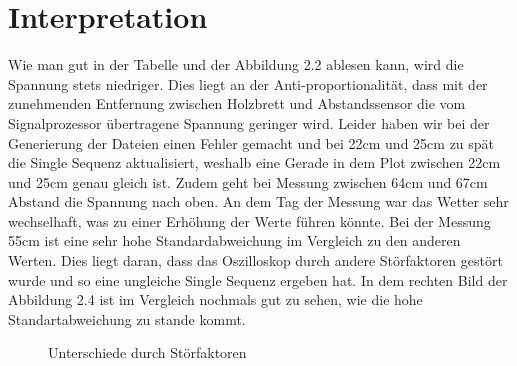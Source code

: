 \documentclass[12pt, oneside, a4paper, \docLanguage]{report}
\begin{document}
\newpage
\section{Interpretation}
\label{chap:VERSUCH_1_INTERPRETATION}
Wie man gut in der Tabelle und der Abbildung 2.2 ablesen kann, wird die Spannung stets niedriger. Dies liegt an der Anti-proportionalität, dass mit der zunehmenden Entfernung zwischen Holzbrett und Abstandssensor die vom Signalprozessor übertragene Spannung geringer wird. 
\newline
Leider haben wir bei der Generierung der Dateien einen Fehler gemacht und bei 22cm und 25cm zu spät die Single Sequenz aktualisiert, weshalb eine Gerade in dem Plot zwischen 22cm und 25cm genau gleich ist.
Zudem geht bei Messung zwischen 64cm und 67cm Abstand die Spannung nach oben. An dem Tag der Messung war das Wetter sehr wechselhaft, was zu einer Erhöhung der Werte führen könnte.
\newline
\newline
Bei der Messung 55cm ist eine sehr hohe Standardabweichung im Vergleich zu den anderen Werten. Dies liegt daran, dass das Oszilloskop durch andere Störfaktoren gestört wurde und so eine ungleiche Single Sequenz ergeben hat.
In dem rechten Bild der Abbildung 2.4 ist im Vergleich nochmals gut zu sehen, wie die hohe Standartabweichung zu stande kommt.

\begin{figure}[hbt!]
  	\centering
  	\hfill
	\caption{Unterschiede durch Störfaktoren}
\end{figure}
\end{document}
